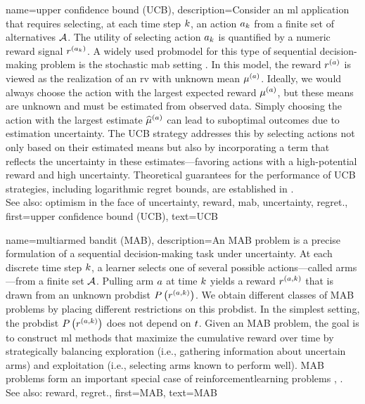 {name={upper confidence bound (UCB)},
	description={Consider an \gls{ml} 
		application that requires selecting, at each time step $k$, an action $a_{k}$ 
		from a finite set of alternatives $\mathcal{A}$. The utility of selecting action $a_{k}$ 
		is quantified by a numeric \gls{reward} signal $r^{(a_{k})}$. 
		A widely used \gls{probmodel} for this type of sequential decision-making problem 
		is the \gls{stochastic} \gls{mab} setting \cite{Bubeck2012}. In this \gls{model}, 
		the \gls{reward} $r^{(a)}$ is viewed as the \gls{realization} of an \gls{rv} 
		with unknown \gls{mean} $\mu^{(a)}$. Ideally, we would always choose the 
		action with the largest expected \gls{reward} $\mu^{(a)}$, but these 
		\glspl{mean} are unknown and must be estimated from observed \gls{data}. Simply 
		choosing the action with the largest estimate $\widehat{\mu}^{(a)}$ can 
		lead to suboptimal outcomes due to estimation \gls{uncertainty}. The UCB strategy 
		addresses this by selecting actions not only based on their estimated \glspl{mean} but 
		also by incorporating a term that reflects the \gls{uncertainty} in these estimates—favoring 
		actions with a high-potential \gls{reward} and high \gls{uncertainty}. Theoretical guarantees 
		for the performance of UCB strategies, including logarithmic \gls{regret} bounds, are established in \cite{Bubeck2012}.
					\\ 
		See also: \gls{optimism in the face of uncertainty}, \gls{reward}, \gls{mab}, \gls{uncertainty}, \gls{regret}.},
	first={upper confidence bound (UCB)},
	text={UCB} 
}

{name={multiarmed bandit (MAB)},
	description={An MAB  problem is a precise 
	formulation of a sequential decision-making task under \gls{uncertainty}. At each 
	discrete time step $k$, a learner selects one of several possible 
	actions—called arms—from a finite set $\mathcal{A}$. Pulling arm $a$ at time 
	$k$ yields a \gls{reward} $r^{(a,k)}$ that is drawn from an unknown 
	\gls{probdist} $P\left(r^{(a,k)}\right)$. We obtain different classes 
	of MAB problems by placing different restrictions on this \gls{probdist}. In the simplest 
	setting, the \gls{probdist} $P\left(r^{(a,k)}\right)$ does not depend on $t$. 
		Given an MAB problem, the goal is to construct \gls{ml} methods that maximize the cumulative 
		\gls{reward} over time by strategically balancing exploration (i.e., gathering information 
		about uncertain arms) and exploitation (i.e., selecting arms known to perform well). 
		MAB problems form an important special case of \gls{reinforcementlearning} problems \cite{Bubeck2012}, \cite{SuttonEd2}.
					\\ 
		See also: \gls{reward}, \gls{regret}.},
	first={MAB},
	text={MAB}
}



